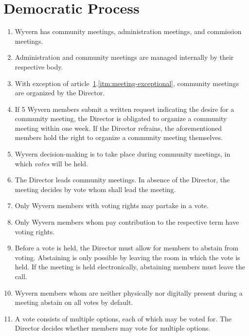 \section{Democratic Process}
\label{sec:democratic-process}
\begin{enumerate}
    \item Wyvern has community meetings, administration meetings, and commission meetings.
    
    \item Administration and community meetings are managed internally by their respective body.

    \item With exception of article~\ref{sec:democratic-process}.\ref{itm:meeting-exceptional}, community meetings are organized by the Director.
    
    \item \label{itm:meeting-exceptional} If 5 Wyvern members submit a written request indicating the desire for a community meeting, the Director is obligated to organize a community meeting within one week. If the Director refrains, the aforementioned members hold the right to organize a community meeting themselves.

    \item Wyvern decision-making is to take place during community meetings, in which \emph{votes} will be held.
    
    \item The Director leads community meetings. In absence of the Director, the meeting decides by vote whom shall lead the meeting.

	\item Only Wyvern members with voting rights may partake in a vote.
    
    \item Only Wyvern members whom pay contribution to the respective term have voting rights.

    \item Before a vote is held, the Director must allow for members to abstain from voting. Abstaining is only possible by leaving the room in which the vote is held. If the meeting is held electronically, abstaining members must leave the call.
    
    \item Wyvern members whom are neither physically nor digitally present during a meeting abstain on all votes by default.

    \item A vote consists of multiple options, each of which may be voted for. The Director decides whether members may vote for multiple options.
    

\end{enumerate}
